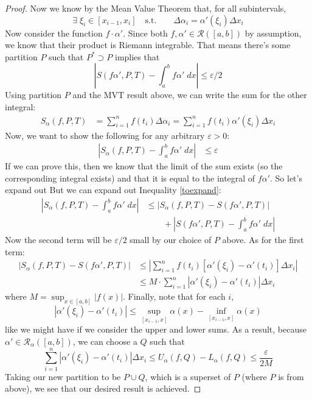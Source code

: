 \documentclass[12pt]{article}
\theoremstyle{plain}
\theoremstyle{definition}
\theoremstyle{remark}
\begin{document}
\begin{proof}
Now we know by the Mean Value Theorem that, for all subintervals,
    \[ 
        \exists \; \xi_i \in [x_{i-1}, x_i] \quad \text{s.t.} 
        \qquad \Delta\alpha_i = \alpha'(\xi_i) \Delta x_i 
    \]
Now consider the function $f\cdot\alpha'$. Since both $f,\alpha' \in\mathscr{R}([a,b])$ by assumption, we know that their product is Riemann integrable.  That means there's some partition $P$ such that $P^*\supset P$ implies that 
    \[ \left\lvert S(f\alpha',P,T) - \int^b_a f\alpha'\;dx 
    \right\rvert \leq \varepsilon/2 \]
Using partition $P$ and the MVT result above, we can write the sum for the other integral:
\begin{align*}
        S_\alpha(f,P,T) &= \sum^n_{i=1} f(t_i) \Delta\alpha_i 
        = \sum^n_{i=1} f(t_i)\alpha'(\xi_i) \Delta x_i
\end{align*}
Now, we want to show the following for any arbitrary $\varepsilon>0$:
\begin{align}
    \label{toexpand}
    \left\lvert  S_\alpha(f,P,T) - \int^b_a f\alpha'\;dx 
        \right\rvert &\leq \varepsilon
\end{align}
If we can prove this, then we know that the limit of the sum exists (so the corresponding integral exists) and that it is equal to the integral of $f\alpha'$. So let's expand out
But we can expand out Inequality \ref{toexpand}:
\begin{align*}
    \left\lvert S_\alpha(f,P,T) - \int^b_a f\alpha'\;dx 
        \right\rvert &\leq 
        \left\lvert S_\alpha(f,P,T) - S(f\alpha',P,T)
        \right\rvert \\
    &\qquad + \left\lvert S(f\alpha',P,T)
        - \int^b_a f\alpha'\;dx \right\rvert 
\end{align*}
Now the second term will be $\varepsilon/2$ small by our choice of $P$ above. As for the first term:
\begin{align*}
    \left\lvert S_\alpha(f,P,T) - S(f\alpha',P,T)
        \right\rvert &\leq 
        \left\lvert \sum^n_{i=1} f(t_i)\left[\alpha'(\xi_i) - 
        \alpha'(t_i)\right] \Delta x_i \right\rvert\\
    &\leq M \cdot
        \sum^n_{i=1} \left\lvert \alpha'(\xi_i) - 
        \alpha'(t_i)\right\rvert \Delta x_i 
\end{align*}
where $M =\sup_{x\in[a,b]}\left\lvert f(x)\right\rvert$. Finally, note that for each $i$,
\[ 
    |\alpha'(\xi_i) - \alpha'(t_i)| \leq 
    \sup_{[x_{i-1}, x]} \alpha(x) - 
    \inf_{[x_{i-1}, x]} \alpha(x) 
\]
like we might have if we consider the upper and lower sums. As a result, because $\alpha'\in\mathscr{R}_\alpha([a,b])$, we can choose a $Q$ such that 
\[ 
    \sum^n_{i=1} \left\lvert \alpha'(\xi_i) - 
    \alpha'(t_i)\right\rvert \Delta x_i 
    \leq U_\alpha(f,Q) - L_\alpha(f,Q) \leq \frac{\varepsilon}{2M}
\]
Taking our new partition to be $P \cup Q$, which is a superset of $P$ (where $P$ is from above), we see that our desired result is achieved.
\end{proof}
\end{document}
